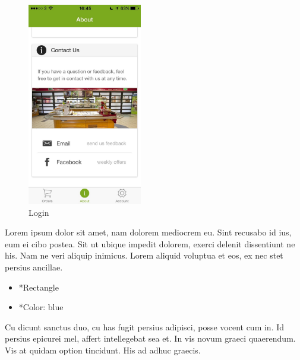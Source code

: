 \begin{minipage}{5cm}
	\begin{figure}[H]
		\includegraphics[width=5cm]{img/mobile-app/screen-shots/IMG_2913.jpg}
		\caption{Login}
	\end{figure}
\end{minipage} \hfill
\begin{minipage}{0.55\textwidth}
	Lorem ipsum dolor sit amet, nam dolorem mediocrem eu. Sint recusabo id ius, eum ei cibo postea. Sit ut ubique impedit dolorem, exerci delenit dissentiunt ne his. Nam ne veri aliquip inimicus. Lorem aliquid voluptua et eos, ex nec stet persius ancillae.
	\begin{itemize}
		\item *Rectangle
		\item *Color: blue
	\end{itemize}
	Cu dicunt sanctus duo, cu has fugit persius adipisci, posse vocent cum in. Id persius epicurei mel, affert intellegebat sea et. In vis novum graeci quaerendum. Vis at quidam option tincidunt. His ad adhuc graecis.
\end{minipage}

